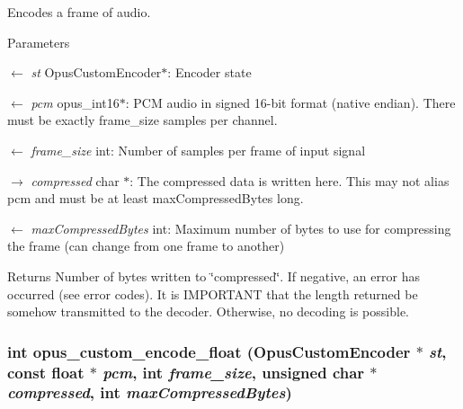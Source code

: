 Encodes a frame of audio. 
\begin{DoxyParams}{Parameters}
\item[\mbox{$\leftarrow$} {\em st}]{\ttfamily OpusCustomEncoder$\ast$}: Encoder state \item[\mbox{$\leftarrow$} {\em pcm}]{\ttfamily opus\_\-int16$\ast$}: PCM audio in signed 16-\/bit format (native endian). There must be exactly frame\_\-size samples per channel. \item[\mbox{$\leftarrow$} {\em frame\_\-size}]{\ttfamily int}: Number of samples per frame of input signal \item[\mbox{$\rightarrow$} {\em compressed}]{\ttfamily char $\ast$}: The compressed data is written here. This may not alias pcm and must be at least maxCompressedBytes long. \item[\mbox{$\leftarrow$} {\em maxCompressedBytes}]{\ttfamily int}: Maximum number of bytes to use for compressing the frame (can change from one frame to another) \end{DoxyParams}
\begin{DoxyReturn}{Returns}
Number of bytes written to \char`\"{}compressed\char`\"{}. If negative, an error has occurred (see error codes). It is IMPORTANT that the length returned be somehow transmitted to the decoder. Otherwise, no decoding is possible. 
\end{DoxyReturn}
\hypertarget{group__opus__custom_ga9403d7a1fc09a0e49692a7f93decee21}{
\subsubsection[{opus\_\-custom\_\-encode\_\-float}]{\setlength{\rightskip}{0pt plus 5cm}int opus\_\-custom\_\-encode\_\-float ({\bf OpusCustomEncoder} $\ast$ {\em st}, \/  const float $\ast$ {\em pcm}, \/  int {\em frame\_\-size}, \/  unsigned char $\ast$ {\em compressed}, \/  int {\em maxCompressedBytes})}}
\label{group__opus__custom_ga9403d7a1fc09a0e49692a7f93decee21}



